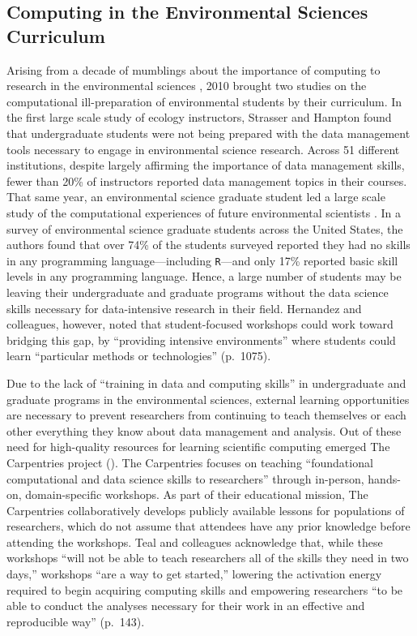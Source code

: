 \documentclass[12pt]{article}
\begin{document}
\subsection{Computing in the Environmental Sciences Curriculum}

\quad Arising from a decade of mumblings about the importance of computing to 
research in the environmental sciences \citep{andelman, dodds1, dodds2, eglen, 
green, hastings, kelling, wilson-software-carpentry, wilson, wing}, 2010 brought
two studies on the computational ill-preparation of environmental students by
their curriculum. In the first large scale study of ecology instructors, 
Strasser and Hampton found that undergraduate students were not being prepared
with the data management tools necessary to engage in environmental science
research. Across 51 different institutions, despite largely affirming the
importance of data management skills, fewer than 20\% of instructors reported
data management topics in their courses. That same year, an environmental
science graduate student led a large scale study of the computational
experiences of future environmental scientists \citep[p.\ 1068]{hernandez}. In a
survey of environmental science graduate students across the United States, the
authors found that over 74\% of the students surveyed reported they had no
skills in any programming language---including \texttt{R}---and only 17\%
reported basic skill levels in any programming language. Hence, a large number
of students may be leaving their undergraduate and graduate programs without the
data science skills necessary for data-intensive research in their field. 
Hernandez and colleagues, however, noted that student-focused workshops could
work toward bridging this gap, by ``providing intensive environments'' where
students could learn ``particular methods or technologies'' (p.\ 1075).

\quad Due to the lack of ``training in data and computing skills'' 
\citep[p.\ 136]{datacarpentry} in undergraduate and graduate programs in the 
environmental sciences, external learning opportunities are necessary to prevent
researchers from continuing to teach themselves or each other everything they
know about data management and analysis. Out of these need for high-quality
resources for learning scientific computing emerged The Carpentries project
(\citeyear{carpentries}). The Carpentries focuses on teaching ``foundational
computational and data science skills to researchers'' through in-person,
hands-on, domain-specific workshops. As part of their educational mission,
The Carpentries collaboratively develops publicly available lessons for
populations of researchers, which do not assume that attendees have any prior
knowledge before attending the workshops. Teal and colleagues acknowledge that,
while these workshops ``will not be able to teach researchers all of the skills
they need in two days,'' workshops ``are a way to get started,'' lowering the
activation energy required to begin acquiring computing skills and empowering
researchers ``to be able to conduct the analyses necessary for their work in an
effective and reproducible way'' (p.\ 143). 
\end{document}
